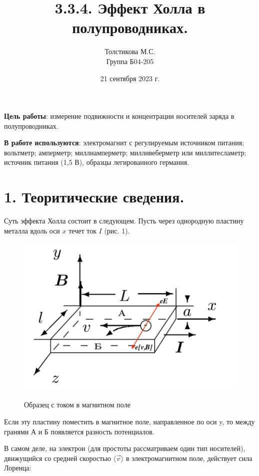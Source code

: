 \documentclass[a4paper,12pt]{article}
\author{Толстикова М.С.\\
Группа Б04-205}
\title{\textbf{3.3.4. Эффект Холла в полупроводниках.}}
\date{21 сентября 2023 г.}
\begin{document}
\maketitle

\leftskip=1cm \rightskip=1cm

\textbf{Цель работы}: измерение подвижности и концентрации носителей заряда в полупроводниках.

\textbf{В работе используются}: электромагнит с регулируемым источником питания; вольтметр; амперметр; миллиамперметр; милливеберметр или миллитесламетр; источник питания (1,5 В), образцы легированного германия.

\leftskip=0cm \rightskip=0cm

\section{1. Теоритические сведения.}
Суть эффекта Холла состоит в следующем. Пусть через однородную пластину металла вдоль оси $x$ течет ток $I$ (рис. 1).
	
	\begin{figure}
		\vspace{-20pt}
		\begin{center}
		\includegraphics[width=0.7\linewidth]{Holl1.png}
			\label{fig:sdfsafd}
		\end{center}
		\vspace{-20pt}
		\caption{Образец с током в магнитном поле}
	\end{figure}

	Если эту пластину поместить в магнитное поле, направленное по оси y, то между гранями А и Б появляется разность потенциалов. 
	
	В самом деле, на электрон (для простоты рассматриваем один тип носителей), движущийся со средней скоростью $\langle \vec{v} \rangle$ в электромагнитном поле, действует сила Лоренца:
	
\end{document}
